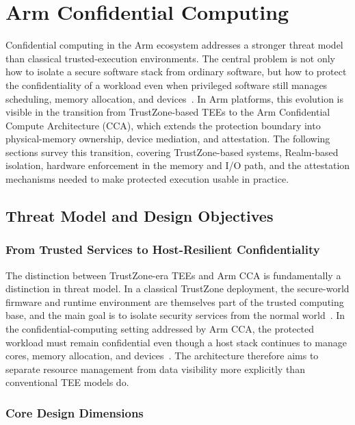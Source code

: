 \section{Arm Confidential Computing}

Confidential computing in the Arm ecosystem addresses a stronger threat model than classical trusted-execution environments. The central problem is not only how to isolate a secure software stack from ordinary software, but how to protect the confidentiality of a workload even when privileged software still manages scheduling, memory allocation, and devices~\cite{arm_trustzone_whitepaper,pinto2019trustzone,li2022cca,arm_cca_spec,arm_rme_spec}. In Arm platforms, this evolution is visible in the transition from TrustZone-based TEEs to the Arm Confidential Compute Architecture (CCA), which extends the protection boundary into physical-memory ownership, device mediation, and attestation. The following sections survey this transition, covering TrustZone-based systems, Realm-based isolation, hardware enforcement in the memory and I/O path, and the attestation mechanisms needed to make protected execution usable in practice.

\subsection{Threat Model and Design Objectives}

\subsubsection{From Trusted Services to Host-Resilient Confidentiality}

The distinction between TrustZone-era TEEs and Arm CCA is fundamentally a distinction in threat model. In a classical TrustZone deployment, the secure-world firmware and runtime environment are themselves part of the trusted computing base, and the main goal is to isolate security services from the normal world~\cite{arm_trustzone_whitepaper,pinto2019trustzone}. In the confidential-computing setting addressed by Arm CCA, the protected workload must remain confidential even though a host stack continues to manage cores, memory allocation, and devices~\cite{li2022cca,arm_cca_spec,arm_rme_spec}. The architecture therefore aims to separate resource management from data visibility more explicitly than conventional TEE models do.

\subsubsection{Core Design Dimensions}

